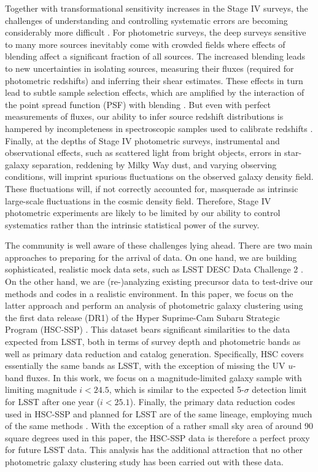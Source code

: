 \documentclass[a4paper,11pt]{article}
\begin{document}
Together with transformational sensitivity increases in the Stage IV surveys, the challenges of understanding and controlling systematic errors are becoming considerably more difficult \cite{1808.07335}. For photometric surveys, the deep surveys sensitive to many more sources inevitably come with crowded fields where effects of blending affect a significant fraction of all sources. The increased blending leads to new uncertainties in isolating sources, measuring their fluxes (required for photometric redshifts) and inferring their shear estimates. These effects in turn lead to subtle sample selection effects, which are amplified by the interaction of the point spread function (PSF) with blending \cite{1708.01533,1905.01324,1907.10572}. But even with perfect measurements of fluxes, our ability to infer source redshift distributions is hampered by incompleteness in spectroscopic samples used to calibrate redshifts \cite{1903.09325}. Finally, at the depths of Stage IV photometric surveys, instrumental and observational effects, such as scattered light from bright objects, errors in star-galaxy separation, reddening by Milky Way dust, and varying observing conditions, will imprint spurious fluctuations on the observed galaxy density field. These fluctuations will, if not correctly accounted for, masquerade as intrinsic large-scale fluctuations in the cosmic density field. Therefore, Stage IV photometric experiments are likely to be limited by our ability to control systematics rather than the intrinsic statistical power of the survey.

The community is well aware of these challenges lying ahead. There are two main approaches to preparing for the arrival of data. On one hand, we are building sophisticated, realistic mock data sets, such as LSST DESC Data Challenge 2 \cite{1909.07340,1907.06530}. On the other hand, we are (re-)analyzing existing precursor data to test-drive our methods and codes in a realistic environment. In this paper, we focus on the latter approach and perform an analysis of photometric galaxy clustering using the first data release (DR1) of the Hyper Suprime-Cam Subaru Strategic Program (HSC-SSP) \cite{2018PASJ...70S...8A}. This dataset bears significant similarities to the data expected from LSST, both in terms of survey depth and photometric bands as well as primary data reduction and catalog generation. Specifically, HSC covers essentially the same bands as LSST, with the exception of missing the UV $u$-band fluxes. In this work, we focus on a magnitude-limited galaxy sample with limiting magnitude $i<24.5$, which is similar to the expected 5-$\sigma$ detection limit for LSST after one year \cite{1809.01669} ($i<25.1$). Finally, the primary data reduction codes used in HSC-SSP and planned for LSST are of the same lineage, employing much of the same methods \cite{2018PASJ...70S...5B,1812.03248}. With the exception of a rather small sky area of around 90 square degrees used in this paper, the HSC-SSP data is therefore a perfect proxy for future LSST data. This analysis has the additional attraction that no other photometric galaxy clustering study has been carried out with these data.
\end{document}
